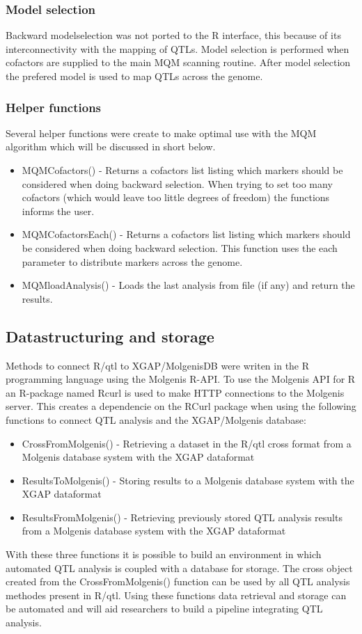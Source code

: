 \subsubsection*{Model selection}
Backward modelselection was not ported to the R interface, this because of its interconnectivity with the mapping of QTLs. 
Model selection is performed when cofactors are supplied to the main MQM scanning routine. After model selection the prefered model
is used to map QTLs across the genome.
\subsubsection*{Helper functions}
Several helper functions were create to make optimal use with the MQM algorithm which will be discussed in short below.
\begin{itemize}
\item MQMCofactors() - Returns a cofactors list listing which markers should be considered when doing backward selection. When trying to set too many cofactors (which would leave too little degrees of freedom) the functions informs the user. 
\item MQMCofactorsEach() - Returns a cofactors list listing which markers should be considered when doing backward selection. This function uses the each parameter to distribute markers across the genome.
\item MQMloadAnalysis() - Loads the last analysis from file (if any) and return the results.
\end{itemize}
\subsection{Datastructuring and storage}
Methods to connect R/qtl to XGAP/MolgenisDB were writen in the R programming language using the Molgenis R-API. 
To use the Molgenis API for R an R-package named Rcurl \cite{Rcurl08} is used to make HTTP connections to the 
Molgenis server. This creates a dependencie on the RCurl package when using the following functions to connect 
QTL analysis and the XGAP/Molgenis database:
\begin{itemize}
\item CrossFromMolgenis() - Retrieving a dataset in the R/qtl cross format from a Molgenis database system with the XGAP dataformat
\item ResultsToMolgenis() - Storing results to a Molgenis database system with the XGAP dataformat
\item ResultsFromMolgenis() - Retrieving previously stored QTL analysis results from a Molgenis database system with the XGAP dataformat
\end{itemize}
With these three functions it is possible to build an environment in which automated QTL analysis is coupled with a database for storage.
The cross object created from the CrossFromMolgenis() function can be used by all QTL analysis methodes present in  R/qtl.
Using these functions data retrieval and storage can be automated and will aid researchers to build a pipeline integrating QTL analysis.
